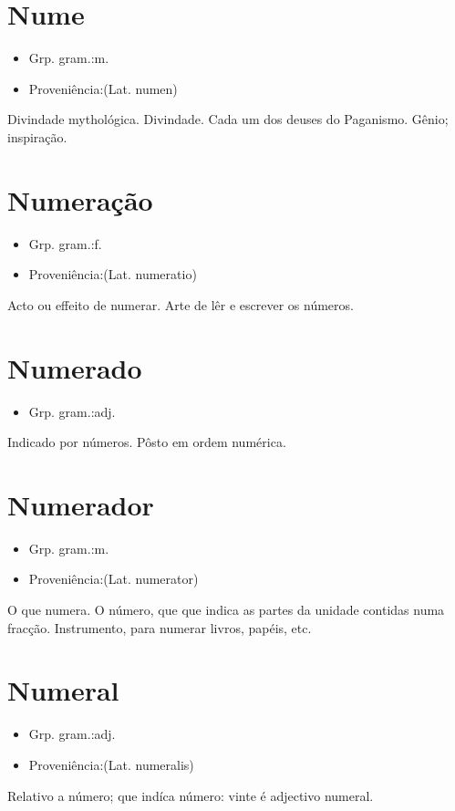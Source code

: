 \section{Nume}
\begin{itemize}
\item {Grp. gram.:m.}
\end{itemize}
\begin{itemize}
\item {Proveniência:(Lat. \textunderscore numen\textunderscore )}
\end{itemize}
Divindade mythológica.
Divindade.
Cada um dos deuses do Paganismo.
Gênio; inspiração.
\section{Numeração}
\begin{itemize}
\item {Grp. gram.:f.}
\end{itemize}
\begin{itemize}
\item {Proveniência:(Lat. \textunderscore numeratio\textunderscore )}
\end{itemize}
Acto ou effeito de numerar.
Arte de lêr e escrever os números.
\section{Numerado}
\begin{itemize}
\item {Grp. gram.:adj.}
\end{itemize}
Indicado por números.
Pôsto em ordem numérica.
\section{Numerador}
\begin{itemize}
\item {Grp. gram.:m.}
\end{itemize}
\begin{itemize}
\item {Proveniência:(Lat. \textunderscore numerator\textunderscore )}
\end{itemize}
O que numera.
O número, que que indica as partes da unidade contidas numa fracção.
Instrumento, para numerar livros, papéis, etc.
\section{Numeral}
\begin{itemize}
\item {Grp. gram.:adj.}
\end{itemize}
\begin{itemize}
\item {Proveniência:(Lat. \textunderscore numeralis\textunderscore )}
\end{itemize}
Relativo a número; que indíca número: \textunderscore vinte é adjectivo numeral\textunderscore .

